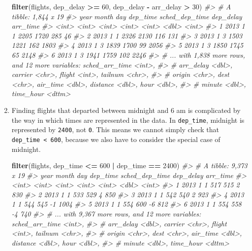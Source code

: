\documentclass[]{book}
\newenvironment{Shaded}{\begin{snugshade}}{\end{snugshade}}
\newcommand{\CommentTok}[1]{\textcolor[rgb]{0.56,0.35,0.01}{\textit{#1}}}
\newcommand{\DecValTok}[1]{\textcolor[rgb]{0.00,0.00,0.81}{#1}}
\newcommand{\KeywordTok}[1]{\textcolor[rgb]{0.13,0.29,0.53}{\textbf{#1}}}
\newcommand{\NormalTok}[1]{#1}
\newcommand{\OperatorTok}[1]{\textcolor[rgb]{0.81,0.36,0.00}{\textbf{#1}}}
\newcommand{\StringTok}[1]{\textcolor[rgb]{0.31,0.60,0.02}{#1}}
\theoremstyle{plain}
\theoremstyle{remark}
\begin{document}
\begin{enumerate}
\begin{Shaded}
\begin{Highlighting}[]
\KeywordTok{filter}\NormalTok{(flights, dep_delay }\OperatorTok{>=}\StringTok{ }\DecValTok{60}\NormalTok{, dep_delay }\OperatorTok{-}\StringTok{ }\NormalTok{arr_delay }\OperatorTok{>}\StringTok{ }\DecValTok{30}\NormalTok{)}
\CommentTok{#> # A tibble: 1,844 x 19}
\CommentTok{#>    year month   day dep_time sched_dep_time dep_delay arr_time}
\CommentTok{#>   <int> <int> <int>    <int>          <int>     <dbl>    <int>}
\CommentTok{#> 1  2013     1     1     2205           1720       285       46}
\CommentTok{#> 2  2013     1     1     2326           2130       116      131}
\CommentTok{#> 3  2013     1     3     1503           1221       162     1803}
\CommentTok{#> 4  2013     1     3     1839           1700        99     2056}
\CommentTok{#> 5  2013     1     3     1850           1745        65     2148}
\CommentTok{#> 6  2013     1     3     1941           1759       102     2246}
\CommentTok{#> # ... with 1,838 more rows, and 12 more variables: sched_arr_time <int>,}
\CommentTok{#> #   arr_delay <dbl>, carrier <chr>, flight <int>, tailnum <chr>,}
\CommentTok{#> #   origin <chr>, dest <chr>, air_time <dbl>, distance <dbl>, hour <dbl>,}
\CommentTok{#> #   minute <dbl>, time_hour <dttm>}
\end{Highlighting}
\end{Shaded}
\item
  Finding flights that departed between midnight and 6 am is complicated by
  the way in which times are represented in the data.
  In \texttt{dep\_time}, midnight is represented by \texttt{2400}, not \texttt{0}.
  This means we cannot simply check that \texttt{dep\_time\ \textless{}\ 600}, because we also have
  to consider the special case of midnight.

\begin{Shaded}
\begin{Highlighting}[]
\KeywordTok{filter}\NormalTok{(flights, dep_time }\OperatorTok{<=}\StringTok{ }\DecValTok{600} \OperatorTok{|}\StringTok{ }\NormalTok{dep_time }\OperatorTok{==}\StringTok{ }\DecValTok{2400}\NormalTok{)}
\CommentTok{#> # A tibble: 9,373 x 19}
\CommentTok{#>    year month   day dep_time sched_dep_time dep_delay arr_time}
\CommentTok{#>   <int> <int> <int>    <int>          <int>     <dbl>    <int>}
\CommentTok{#> 1  2013     1     1      517            515         2      830}
\CommentTok{#> 2  2013     1     1      533            529         4      850}
\CommentTok{#> 3  2013     1     1      542            540         2      923}
\CommentTok{#> 4  2013     1     1      544            545        -1     1004}
\CommentTok{#> 5  2013     1     1      554            600        -6      812}
\CommentTok{#> 6  2013     1     1      554            558        -4      740}
\CommentTok{#> # ... with 9,367 more rows, and 12 more variables: sched_arr_time <int>,}
\CommentTok{#> #   arr_delay <dbl>, carrier <chr>, flight <int>, tailnum <chr>,}
\CommentTok{#> #   origin <chr>, dest <chr>, air_time <dbl>, distance <dbl>, hour <dbl>,}
\CommentTok{#> #   minute <dbl>, time_hour <dttm>}
\end{Highlighting}
\end{Shaded}


\end{enumerate}
\end{document}
